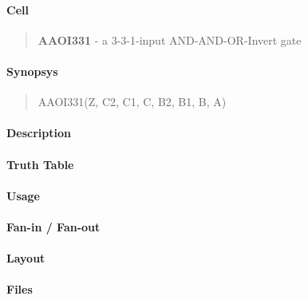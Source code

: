 \label{AAOI331}
\paragraph{Cell}
\begin{quote}
    \textbf{AAOI331} - a 3-3-1-input AND-AND-OR-Invert gate
\end{quote}

\paragraph{Synopsys}
\begin{quote}
    AAOI331(Z, C2, C1, C, B2, B1, B, A)
\end{quote}

\paragraph{Description}



\paragraph{Truth Table}


\paragraph{Usage}

\paragraph{Fan-in / Fan-out}

\paragraph{Layout}

\paragraph{Files}
